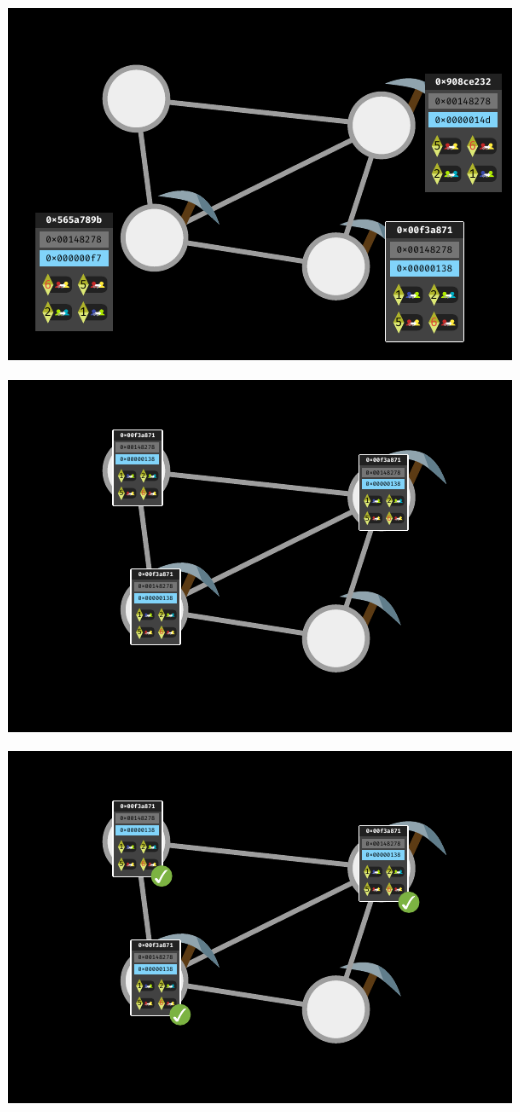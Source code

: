 \documentclass[xcolor=x11names,compress]{beamer}
\begin{document}
\begin{frame}
\begin{overprint}
\begin{center}
		\end{center}
		\begin{center}
			\includegraphics[width=\textwidth,height=0.8\textheight,keepaspectratio]{img/mining/09.pdf}
		\end{center}
		\begin{center}
			\includegraphics[width=\textwidth,height=0.8\textheight,keepaspectratio]{img/mining/10.pdf}
		\end{center}
		\begin{center}
			\includegraphics[width=\textwidth,height=0.8\textheight,keepaspectratio]{img/mining/11.pdf}

\end{center}
\end{overprint}
\end{frame}
\end{document}
